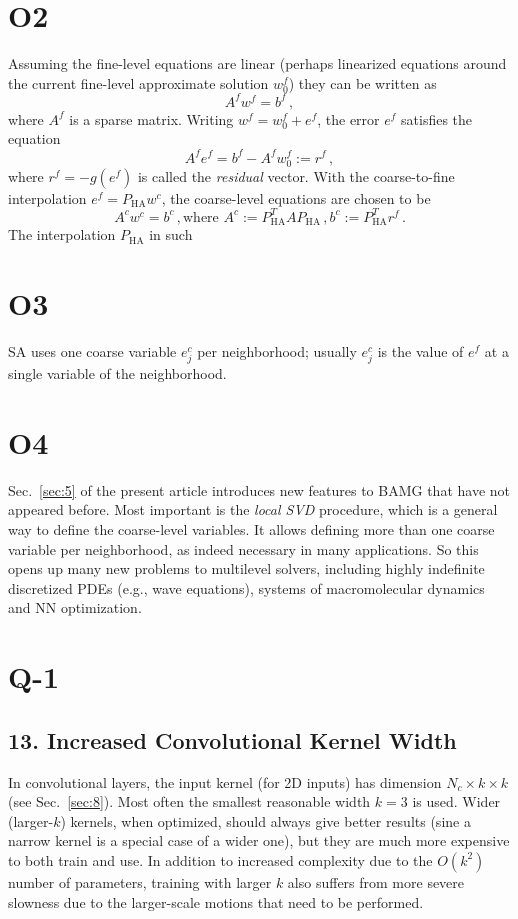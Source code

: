 \documentclass{article} %
\begin{document}
\section{O2}
Assuming the fine-level equations are linear (perhaps linearized equations around the current fine-level approximate solution $w_0^f$) they can be written as
$$A^f w^f = b^f\,,$$
where $A^f$ is a sparse matrix. Writing $w^f = w_0^f + e^f$, the error $e^f$ satisfies the equation
$$A^f e^f = b^f - A^f w_0^f := r^f\,,$$
where $r^f = -g(e^f)$ is called the {\it residual} vector. With the coarse-to-fine interpolation $e^f = P_{\text{HA}} w^c$, the coarse-level equations are chosen to be
$$A^c w^c = b^c\,,\text{where } A^c := P_{\text{HA}}^T A P_{\text{HA}}\,, b^c := P_{\text{HA}}^T r^f\,.$$
The interpolation $P_{\text{HA}}$ in such

\section{O3}
SA uses one coarse variable $e_j^c$ per neighborhood; usually $e_j^c$ is the value of $e^f$ at a single variable of the neighborhood.

\section{O4}
Sec.~\ref{sec:5} of the present article introduces new features to BAMG that have not appeared before. Most important is the {\it local SVD} procedure, which is a general way to define the coarse-level variables. It allows defining more than one coarse variable per neighborhood, as indeed necessary in many applications. So this opens up many new problems to multilevel solvers, including highly indefinite discretized PDEs (e.g., wave equations), systems of macromolecular dynamics and NN optimization.

\section{Q-1}
\subsection{13. Increased Convolutional Kernel Width}
In convolutional layers, the input kernel (for 2D inputs) has dimension $N_c \times k \times k$ (see Sec.~\ref{sec:8}). Most often the smallest reasonable width $k = 3$ is used. Wider (larger-$k$) kernels, when optimized, should always give better results (sine a narrow kernel is a special case of a wider one), but they are much more expensive to both train and use. In addition  to increased complexity due to the $O(k^2)$ number of parameters, training with larger $k$ also suffers from more severe slowness due to the larger-scale motions that need to be performed.
\end{document}
